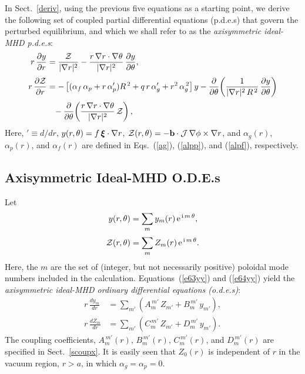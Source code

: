 \documentclass[12pt,prb,aps]{revtex4-1}
\newcommand {\bxi}{\mbox{\boldmath$\xi$}}
\begin{document}
In Sect.~\ref{deriv}, using the previous five equations as a starting point, we derive the following set of coupled partial differential equations (p.d.e.s) that govern the perturbed equilibrium,  and which we shall refer to as the 
{\em axisymmetric ideal-MHD p.d.e.s}:
\begin{align}\label{e63yy}
r\,\frac{\partial y}{\partial r} &= \frac{{\cal Z}}{|\nabla r|^2} - \frac{r\,\nabla r\cdot\nabla\theta}{|\nabla r|^2}\,\frac{\partial y}{\partial\theta},\\[0.5ex]
r\,\frac{\partial {\cal Z}}{\partial r}&= -\left[(\alpha_f\,\alpha_p+ r\,\alpha_p')R^{\,2} + q\,r\,\alpha_g'+r^2\,\alpha_g^{\,2}\right]y-\frac{\partial}{\partial\theta}\!\left(\frac{1}{|\nabla r|^2\,R^{\,2}}\,\frac{\partial y}{\partial\theta}\right)\nonumber\\[0.5ex]
&\phantom{=} -\frac{\partial}{\partial\theta}\!\left(\frac{r\,\nabla r\cdot\nabla\theta}{|\nabla r|^2}\,{\cal Z}\right),\label{e64yy}
\end{align}
Here, $'\equiv d/dr$, $y(r,\theta)=f\,\bxi\cdot\nabla r$, ${\cal Z}(r,\theta)= -{\bf b}\cdot {\cal J}\,\nabla\phi\times \nabla r$, and $\alpha_g(r)$, $\alpha_p(r)$,
and $\alpha_f(r)$ are defined in Eqs.~(\ref{ag}), (\ref{alpp}), and (\ref{alpf}), respectively. 

\subsection{Axisymmetric Ideal-MHD O.D.E.s}\label{ode}
Let
\begin{align}\label{e62s}
y(r,\theta)&= \sum_m y_m(r)\,{\rm e}^{\,{\rm i}\,m\,\theta},\\[0.5ex]
{\cal Z}(r,\theta) &= \sum_m Z_m(r)\,{\rm e}^{\,{\rm i}\,m\,\theta}.\label{e63s}
\end{align}
Here, the $m$ are the set of (integer, but not necessarily positive) poloidal mode numbers included in the calculation. 
Equations~(\ref{e63yy}) and (\ref{e64yy}) yield the  {\em axisymmetric ideal-MHD ordinary differential equations (o.d.e.s)}:
\begin{align}\label{e69u}
r\,\frac{dy_m}{dr}&= \sum_{m'}\left(A_{m}^{\,m'}\,Z_{m'} + B_{m}^{\,m'}\,y_{m'}\right),\\[0.5ex]
r\,\frac{dZ_m}{dr}&= \sum_{m'}\left(C_{m}^{\,m'}\,Z_{m'} + D_{m}^{\,m'}\,y_{m'}\right).\label{e70uu}
\end{align}
The coupling coefficients, $A_m^{\,m'}(r)$, $B_m^{\,m'}(r)$, $C_{m}^{\,m'}(r)$, and $D_m^{\,m'}(r)$ are specified in Sect.~\ref{scoupx}.
 It is easily seen that $Z_0(r)$ is independent of $r$ in the vacuum region, $r> a$,  in which
$\alpha_g=\alpha_p=0$. 
\end{document}
